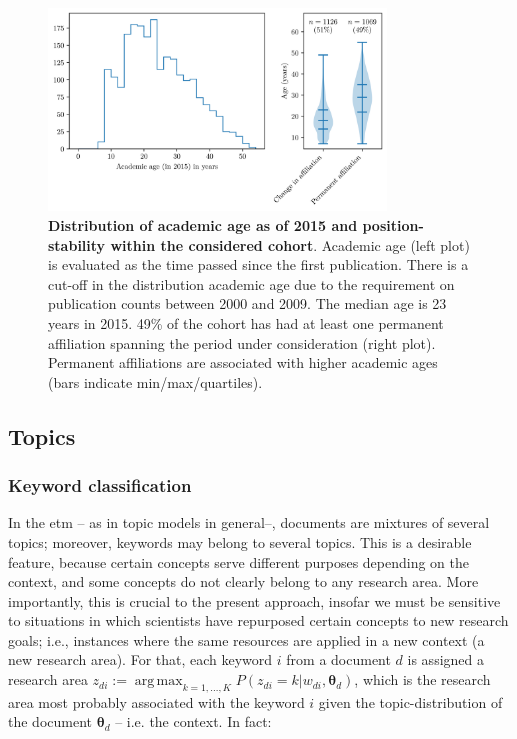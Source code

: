 \documentclass{article}
\DeclareMathOperator*{\argmax}{arg\,max}
\begin{document}
\begin{figure}[H]
    \centering
    \includegraphics[width=0.8\textwidth]{plots/sample_characteristics.png}
    \caption{\textbf{Distribution of academic age as of 2015 and position-stability within the considered cohort}.  Academic age (left plot) is evaluated as the time passed since the first publication. There is a cut-off in the distribution academic age due to the requirement on publication counts between 2000 and 2009. The median age is 23 years in 2015. 49\% of the cohort has had at least one permanent affiliation spanning the period under consideration (right plot). Permanent affiliations are associated with higher academic ages (bars indicate min/max/quartiles). }
    \label{fig:sample_characteristics}
\end{figure}

\subsection{\label{appendix:topics}Topics}

\subsubsection{\label{appendix:keywords}Keyword classification}

In the \gls{etm} -- as in topic models in general--, documents are mixtures of several topics; moreover, keywords may belong to several topics. This is a desirable feature, because certain concepts serve different purposes depending on the context, and some concepts do not clearly belong to any research area. More importantly, this is crucial to the present approach, insofar we must be sensitive to situations in which scientists have repurposed certain concepts to new research goals; i.e., instances where the same resources are applied in a new context (a new research area). %
For that, each keyword $i$ from a document $d$ is assigned a research area $z_{di} := \argmax_{k=1,\dots,K} P(z_{di}=k|w_{di},\bm{\theta}_{d})$, which is the research area most probably associated with the keyword $i$ given the topic-distribution of the document $\bm{\theta}_d$ -- i.e. the context. In fact:
\end{document}
